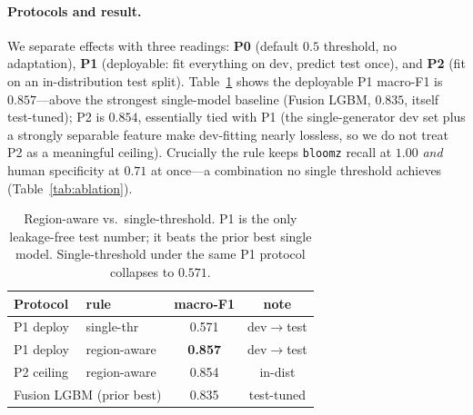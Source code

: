\documentclass[11pt]{article}
\begin{document}
\paragraph{Protocols and result.} We separate effects with three readings:
\textbf{P0} (default $0.5$ threshold, no adaptation), \textbf{P1} (deployable:
fit everything on dev, predict test once), and \textbf{P2} (fit on an
in-distribution test split). Table~\ref{tab:method} shows the deployable P1
macro-F1 is $0.857$---above the strongest single-model baseline (Fusion LGBM,
$0.835$, itself test-tuned); P2 is $0.854$, essentially tied with P1 (the
single-generator dev set plus a strongly separable feature make dev-fitting
nearly lossless, so we do not treat P2 as a meaningful ceiling). Crucially the
rule keeps \texttt{bloomz} recall at $1.00$ \emph{and} human specificity at
$0.71$ at once---a combination no single threshold achieves
(Table~\ref{tab:ablation}).

\begin{table}[t]\centering\small
\begin{tabular}{llcc}
\toprule
Protocol & rule & macro-F1 & note \\
\midrule
P1 deploy & single-thr & 0.571 & dev$\to$test \\
P1 deploy & region-aware & \textbf{0.857} & dev$\to$test \\
P2 ceiling & region-aware & 0.854 & in-dist \\
\midrule
\multicolumn{2}{l}{Fusion LGBM (prior best)} & 0.835 & test-tuned \\
\bottomrule
\end{tabular}
\caption{Region-aware vs.\ single-threshold. P1 is the only leakage-free test
number; it beats the prior best single model. Single-threshold under the same
P1 protocol collapses to $0.571$.}
\label{tab:method}
\end{table}
\end{document}

